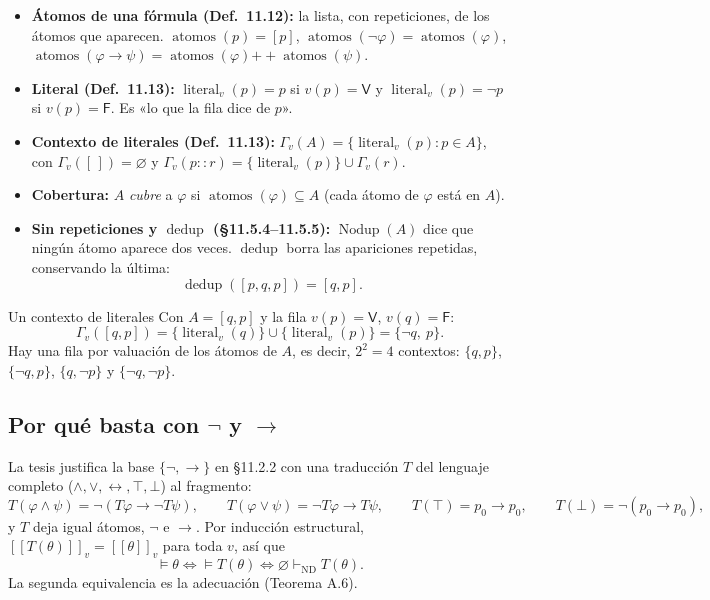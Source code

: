 \documentclass[11pt,a4paper]{article}
\newcommand{\Provnd}{\vdash_{\mathrm{ND}}}
\newcommand{\Imp}{\rightarrow}
\newcommand{\Not}{\neg}
\newcommand{\sem}[1]{[\![#1]\!]}
\newcommand{\atomos}{\operatorname{atomos}}
\newcommand{\lit}{\operatorname{literal}}
\newcommand{\Nodup}{\operatorname{Nodup}}
\newcommand{\dedup}{\operatorname{dedup}}
\newcommand{\V}{\mathsf{V}}
\newcommand{\F}{\mathsf{F}}
\begin{document}
\begin{itemize}
  \item \textbf{Átomos de una fórmula (Def.~11.12):} la lista, con
    repeticiones, de los átomos que aparecen.
    \(\atomos(p)=[p]\), \(\atomos(\Not\varphi)=\atomos(\varphi)\),
    \(\atomos(\varphi\Imp\psi)=\atomos(\varphi)\mathbin{+\!\!+}\atomos(\psi)\).
  \item \textbf{Literal (Def.~11.13):} \(\lit_v(p)=p\) si \(v(p)=\V\) y
    \(\lit_v(p)=\Not p\) si \(v(p)=\F\). Es «lo que la fila dice de \(p\)».
  \item \textbf{Contexto de literales (Def.~11.13):}
    \(\Gamma_v(A)=\{\lit_v(p):p\in A\}\), con
    \(\Gamma_v([\,])=\varnothing\) y
    \(\Gamma_v(p::r)=\{\lit_v(p)\}\cup\Gamma_v(r)\).
  \item \textbf{Cobertura:} \(A\) \emph{cubre} a \(\varphi\) si
    \(\atomos(\varphi)\subseteq A\) (cada átomo de \(\varphi\) está en \(A\)).
  \item \textbf{Sin repeticiones y \(\dedup\) (§11.5.4--11.5.5):}
    \(\Nodup(A)\) dice que ningún átomo aparece dos veces. \(\dedup\) borra
    las apariciones repetidas, conservando la última:
    \[\dedup([p,q,p])=[q,p].\]
\end{itemize}

\begin{ejemplo}{Un contexto de literales}
Con \(A=[q,p]\) y la fila \(v(p)=\V\), \(v(q)=\F\):
\[
\Gamma_v([q,p])=\{\lit_v(q)\}\cup\{\lit_v(p)\}=\{\Not q,\ p\}.
\]
Hay una fila por valuación de los átomos de \(A\), es decir,
\(2^{2}=4\) contextos: \(\{q,p\}\), \(\{\Not q,p\}\), \(\{q,\Not p\}\) y
\(\{\Not q,\Not p\}\).
\end{ejemplo}

\subsection{\texorpdfstring{Por qué basta con \(\Not\) y \(\Imp\)}{Por qué basta con negación e implicación}}\label{sec:base}

La tesis justifica la base \(\{\Not,\Imp\}\) en §11.2.2 con una traducción
\(T\) del lenguaje completo (\(\wedge,\vee,\leftrightarrow,\top,\bot\)) al
fragmento:
\[
T(\varphi\wedge\psi)=\Not(T\varphi\Imp\Not T\psi),\qquad
T(\varphi\vee\psi)=\Not T\varphi\Imp T\psi,\qquad
T(\top)=p_0\Imp p_0,\qquad T(\bot)=\Not(p_0\Imp p_0),
\]
y \(T\) deja igual átomos, \(\Not\) e \(\Imp\). Por inducción estructural,
\(\sem{T(\theta)}_v=\sem{\theta}_v\) para toda \(v\), así que
\[
\models\theta\iff\models T(\theta)\iff\varnothing\Provnd T(\theta).
\]
La segunda equivalencia es la adecuación (Teorema A.6).
\end{document}
